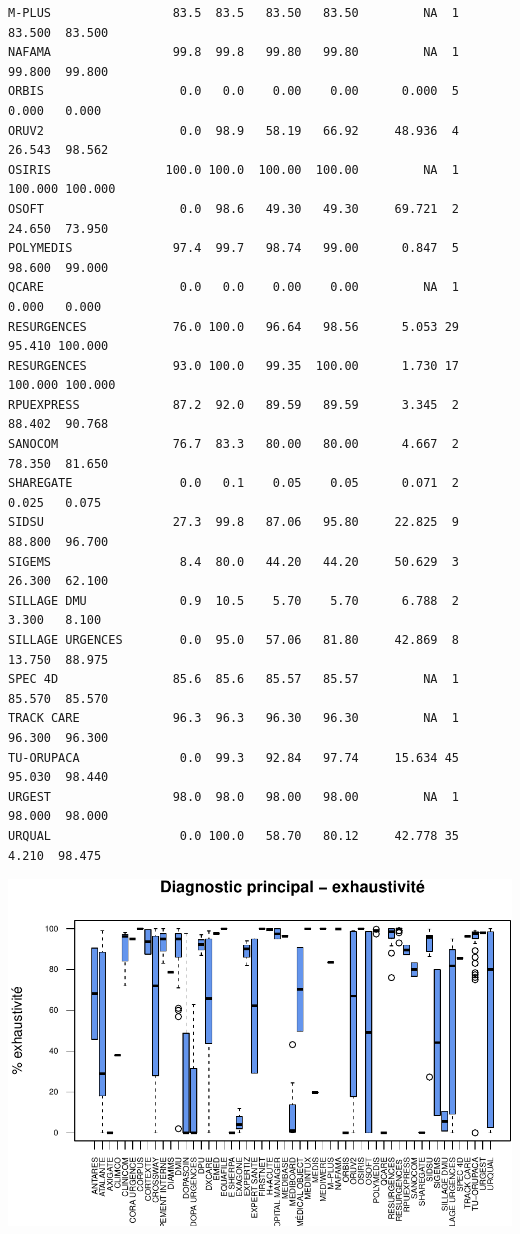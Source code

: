 \documentclass[]{article}
\begin{document}
\begin{verbatim}
M-PLUS                 83.5  83.5   83.50   83.50         NA  1  83.500  83.500
NAFAMA                 99.8  99.8   99.80   99.80         NA  1  99.800  99.800
ORBIS                   0.0   0.0    0.00    0.00      0.000  5   0.000   0.000
ORUV2                   0.0  98.9   58.19   66.92     48.936  4  26.543  98.562
OSIRIS                100.0 100.0  100.00  100.00         NA  1 100.000 100.000
OSOFT                   0.0  98.6   49.30   49.30     69.721  2  24.650  73.950
POLYMEDIS              97.4  99.7   98.74   99.00      0.847  5  98.600  99.000
QCARE                   0.0   0.0    0.00    0.00         NA  1   0.000   0.000
RESURGENCES            76.0 100.0   96.64   98.56      5.053 29  95.410 100.000
RESURGENCES            93.0 100.0   99.35  100.00      1.730 17 100.000 100.000
RPUEXPRESS             87.2  92.0   89.59   89.59      3.345  2  88.402  90.768
SANOCOM                76.7  83.3   80.00   80.00      4.667  2  78.350  81.650
SHAREGATE               0.0   0.1    0.05    0.05      0.071  2   0.025   0.075
SIDSU                  27.3  99.8   87.06   95.80     22.825  9  88.800  96.700
SIGEMS                  8.4  80.0   44.20   44.20     50.629  3  26.300  62.100
SILLAGE DMU             0.9  10.5    5.70    5.70      6.788  2   3.300   8.100
SILLAGE URGENCES        0.0  95.0   57.06   81.80     42.869  8  13.750  88.975
SPEC 4D                85.6  85.6   85.57   85.57         NA  1  85.570  85.570
TRACK CARE             96.3  96.3   96.30   96.30         NA  1  96.300  96.300
TU-ORUPACA              0.0  99.3   92.84   97.74     15.634 45  95.030  98.440
URGEST                 98.0  98.0   98.00   98.00         NA  1  98.000  98.000
URQUAL                  0.0 100.0   58.70   80.12     42.778 35   4.210  98.475
\end{verbatim}

\includegraphics{septembre2015_files/figure-latex/unnamed-chunk-24-1.pdf}
\end{document}
